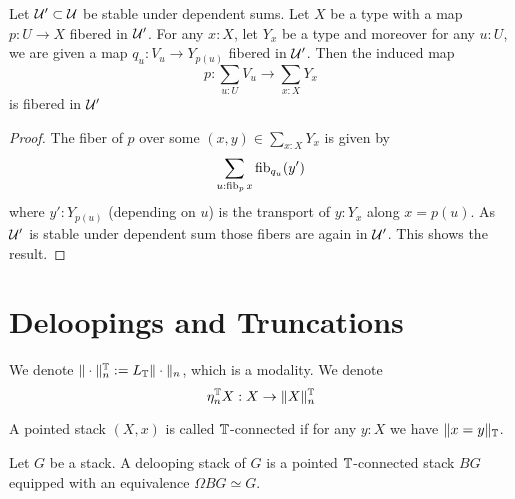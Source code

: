 \documentclass{article}
\begin{document}
\begin{lemma}{\label{lemma:AtlasSum}}
	Let $\mathcal{U}' \subset \mathcal{U}$ be stable under dependent sums.
	Let $X$ be a type with a  map $p : U \to X$ fibered in $\mathcal{U}'$.  For any $x : X$, let $Y_x$ be a type and moreover for any $u : U$, we are given a map $q_u : V_u \to Y_{p(u)}$ fibered in $\mathcal{U}'$. Then the induced map
	\[
	p : \sum_{u : U} V_u \to \sum_{x : X} Y_{x}
	\]
	is fibered in $\mathcal{U}'$
\end{lemma}
\begin{proof}
	The fiber of $p$ over some $(x,y) \in \sum_{x :X} Y_x$ is given by
	\[
	\sum_{u : \operatorname{fib}_p x} \operatorname{fib}_{q_u} (y') 
	\]
	where $y' : Y_{p(u)}$ (depending on $u$) is the transport of $y : Y_x$ along $x = p(u)$. As $\mathcal{U}'$ is stable under dependent sum %
	those fibers are again in $\mathcal{U}'$. This shows the result.
\end{proof}














\section{Deloopings and Truncations}

We denote $\| \cdot \|_n^{\mathbb{T}} := L_{\mathbb{T}} \| \cdot \|_n$, which is a modality. We denote 
\[
\eta_n^{\mathbb{T}} X : X \to \| X\|_n^{\mathbb{T}}
\]
\begin{definition}
	A pointed stack $(X,x)$ is called $\mathbb{T}$-connected if for any $y : X$ we have $\|x = y\|_{\mathbb{T}}$.
\end{definition}
\begin{definition}
	Let $G$ be a stack. A delooping stack of $G$ is a  pointed $\mathbb{T}$-connected stack $B G$ equipped with an equivalence $\Omega B G \simeq G$.
\end{definition}
\end{document}
